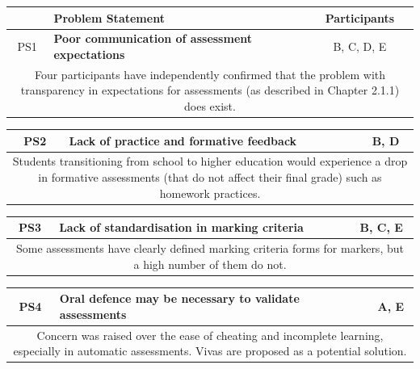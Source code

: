 \begin{table}[!ht]
	\begin{tabularx}{\textwidth}{|c|X|c|}
		\hline
		    & Problem Statement                                      & Participants \\
		\hline
		PS1 & \textbf{Poor communication of assessment expectations} & B, C, D, E   \\
		\hline
		\multicolumn{3}{|X|}{Four participants have independently confirmed that the problem with transparency in expectations for
			assessments (as described in Chapter 2.1.1) does exist.}                    \\
		\hline
	\end{tabularx}
\end{table}
\begin{table}[!ht]
	\begin{tabularx}{\textwidth}{|c|X|c|}
		\hline
		PS2 & \textbf{Lack of practice and formative feedback} & B, D       \\
		\hline
		\multicolumn{3}{|X|}{Students transitioning from school to higher education would experience a drop in formative assessments
			(that do not affect their final grade) such as homework practices.} \\
		\hline
	\end{tabularx}
\end{table}
\begin{table}[!ht]
	\begin{tabularx}{\textwidth}{|c|X|c|}
		\hline
		PS3 & \textbf{Lack of standardisation in marking criteria} & B, C, E \\
		\hline
		\multicolumn{3}{|X|}{Some assessments have clearly defined marking criteria forms for markers, but a high
			number of them do not.}                                              \\
		\hline
	\end{tabularx}
\end{table}
\begin{table}[!ht]
	\begin{tabularx}{\textwidth}{|c|X|c|}
		\hline
		PS4 & \textbf{Oral defence may be necessary to validate assessments} & A, E                 \\
		\hline
		\multicolumn{3}{|X|}{Concern was raised over the ease of cheating and incomplete
			learning, especially in automatic assessments. Vivas are proposed as a potential solution.} \\
		\hline
	\end{tabularx}
\end{table}
